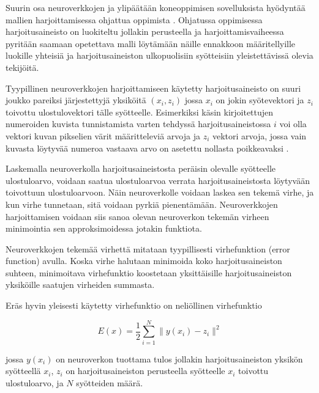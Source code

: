 \documentclass[finnish]{tktltiki2}
\theoremstyle{definition}
\theoremstyle{remark}
\begin{document}
  Suurin osa neuroverkkojen ja ylipäätään koneoppimisen sovelluksista hyödyntää mallien harjoittamisessa ohjattua oppimista \cite{nature-lecun15}. Ohjatussa oppimisessa harjoitusaineisto on luokiteltu jollakin perusteella ja harjoittamisvaiheessa pyritään saamaan opetettava malli löytämään näille ennakkoon määritellyille luokille yhteisiä ja harjoitusaineiston ulkopuolisiin syötteisiin yleistettävissä olevia tekijöitä. 
  
  Tyypillinen neuroverkkojen harjoittamiseen käytetty harjoitusaineisto on suuri joukko pareiksi järjestettyjä yksiköitä $ {(x_i, z_i)} $ jossa $x_i$ on jokin syötevektori ja $z_i$ toivottu ulostulovektori tälle syötteelle. Esimerkiksi käsin kirjoitettujen numeroiden kuvista tunnistamista varten tehdyssä harjoitusaineistossa $i$ voi olla vektori kuvan pikselien värit määritteleviä arvoja ja $z_i$ vektori arvoja, jossa vain kuvasta löytyvää numeroa vastaava arvo on asetettu nollasta poikkeavaksi \cite{Nielsen-neural}.

  Laskemalla neuroverkolla harjoitusaineistosta peräisin olevalle syötteelle ulostuloarvo, voidaan saatua ulostuloarvoa verrata harjoitusaineistosta löytyvään toivottuun ulostuloarvoon. Näin neuroverkolle voidaan laskea sen tekemä virhe, ja kun virhe tunnetaan, sitä voidaan pyrkiä pienentämään. 
  Neuroverkkojen harjoittamisen voidaan siis sanoa olevan neuroverkon tekemän virheen minimointia sen approksimoidessa jotakin funktiota.
  
  Neuroverkkojen tekemää virhettä mitataan tyypillisesti virhefunktion (error function) avulla. Koska virhe halutaan minimoida koko harjoitusaineiston suhteen, minimoitava virhefunktio koostetaan yksittäisille harjoitusaineiston yksiköille saatujen virheiden summasta.

   Eräs hyvin yleisesti käytetty virhefunktio on neliöllinen virhefunktio

  \begin{equation}
    E(x) = \frac{1}{2} \sum_{i=1}^{N} \| y(x_i) - z_i \|^2
    \label{eq:error-function}
  \end{equation}

  jossa $y(x_i)$ on neuroverkon tuottama tulos jollakin harjoitusaineiston yksikön syötteellä $x_i$, $z_i$ on harjoitusaineiston perusteella syötteelle $x_i$ toivottu ulostuloarvo, ja $N$ syötteiden määrä.
\end{document}

